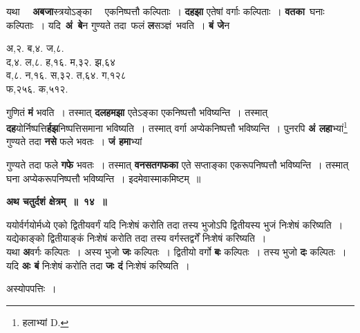 \documentclass[11pt, openany]{book}
\begin{document}
\begin{flushleft}
\begin{minipage}[t]{0.49\textwidth}
\hspace{4mm} यथा ~~\textbf{अबजा}स्त्रयोऽङ्का ~~एकनिष्पत्तौ कल्पिताः~। \textbf{दहझा} एतेषां  वर्गाः कल्पिताः~। \textbf{वतका} \,घनाः \,कल्पिताः~। यदि \,\textbf{अं \,बे}न गुण्यते तदा \,फलं \textbf{ल}सञ्ज्ञं \,भवति~। \textbf{बं जे}न
\end{minipage} 
\hfill
\begin{minipage}[t]{0.42\textwidth}
\begin{center}
अ,२. ब,४. ज,८. \\
द,४. ल,८. ह,१६. म,३२. झ,६४ \\
व,८. न,१६. स,३२. त,६४. ग,१२८\\
फ,२५६. क,५१२. 
\end{center}
\end{minipage}
\end{flushleft}
\vspace{-3mm}

\noindent गुणितं \textbf{मं} भवति~। तस्मात् \textbf{दलहमझा} एतेऽङ्का एकनिष्पत्तौ भविष्यन्ति~। तस्मात् \textbf{दह}योर्निष्पत्ति\textbf{र्हझ}निष्पत्तिसमाना भविष्यति~। तस्मात् वर्गा अप्येकनिष्पत्तौ भविष्यन्ति~। पुनरपि \textbf{अं लहा}भ्यां\renewcommand{\thefootnote}{१}\footnote{हलाभ्यां {\en D.}} गुण्यते तदा \textbf{नसे} फले भवतः~। \textbf{जं हमा}भ्यां

\newpage
\noindent गुण्यते तदा फले \textbf{गफे} भवतः~। तस्मात् \textbf{वनसतगफका} एते सप्ताङ्का एकरूपनिष्पत्तौ भविष्यन्ति~। तस्मात् घना अप्येकरूपनिष्पत्तौ भविष्यन्ति~। इदमेवास्माकमिष्टम्~॥ 
\vspace{2mm}

\begin{center}
\textbf{\large अथ चतुर्दशं क्षेत्रम्~॥~१४~॥}
\end{center}

{\ab ययोर्वर्गयोर्मध्ये एको द्वितीयवर्गं यदि निःशेषं करोति  तदा तस्य भुजोऽपि द्वितीयस्य भुजं निःशेषं करिष्यति~। यद्येकाङ्को द्वितीयाङ्कं निःशेषं करोति तदा तस्य वर्गस्तद्वर्गें निःशेषं करिष्यति~। }\\

 यथा \textbf{अ}वर्गः कल्पितः~। अस्य भुजो \textbf{जः} कल्पितः~। द्वितीयो वर्गो \textbf{बः} कल्पितः~। तस्य भुजो \textbf{दः} कल्पितः~। यदि \textbf{अः बं} निःशेषं करोति तदा \textbf{जः दं} निःशेषं करिष्यति~। 

\begin{center}
अस्योपपत्तिः~।
\end{center}
\end{document}
